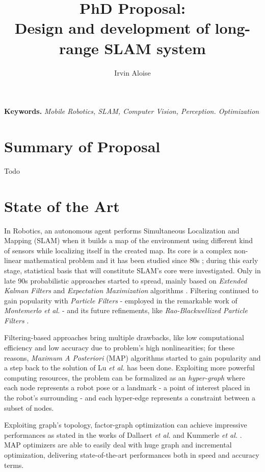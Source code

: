 \documentclass[10pt,a4paper, notitlepage]{report}
\title{PhD Proposal: \\ Design and development of long-range SLAM system}
\author{Irvin Aloise}
\begin{document}
\maketitle


\textbf{Keywords.} \textit{Mobile Robotics, SLAM, Computer Vision, Perception. Optimization}


\section*{Summary of Proposal}
Todo


\section*{State of the Art}
In Robotics, an autonomous agent performs Simultaneous Localization and Mapping (SLAM) when it builds a map of the environment using different kind of sensors while localizing itself in the created map. Its core is a complex non-linear mathematical problem and it has been studied since 80s \cite{durrant2006simultaneous} \cite{bailey2006simultaneous}; during this early stage, statistical basis that will constitute SLAM's core were investigated. Only in late 90s probabilistic approaches started to spread, mainly based on \textit{Extended Kalman Filters} \cite{leonard1990dynamic} \cite{dissanayake2001solution} and \textit{Expectation Maximization} algorithms \cite{dellaert2003mcmc} \cite{thrun2001probabilistic}. Filtering continued to gain popularity with \textit{Particle Filters} - employed in the remarkable work of \textit{Montemerlo et al.} \cite{montemerlo2002fastslam} - and its future refinements, like \textit{Rao-Blackwellized Particle Filters} \cite{grisetti2005improving} \cite{carlone2010rao} \cite{tipaldi2007heterogeneous}.

Filtering-based approaches bring multiple drawbacks, like low computational efficiency and low accuracy due to problem's high nonlinearities; for these reasons, \textit{Maximum A Posteriori} (MAP) algorithms started to gain popularity and a step back to the solution of Lu \textit{et al.} \cite{lu1997globally} has been done. Exploiting more powerful computing resources, the problem can be formalized as an \textit{hyper-graph} where each node represents a robot pose or a landmark - a point of interest placed in the robot's surrounding - and each hyper-edge represents a constraint between a subset of nodes. 

Exploiting graph's topology, factor-graph optimization can achieve impressive performances as stated in the works of Dallaert \textit{et al.} \cite{dellaert2006square} and Kummerle \textit{et al.}  \cite{kummerle2011g}. MAP optimizers \cite{kummerle2011g} \cite{dellaert2012gtsam} \cite{ceres-solver} \cite{kaess2012isam2} are able to easily deal with huge graph and incremental optimization, delivering state-of-the-art performances both in speed and accuracy terms.
\end{document}
